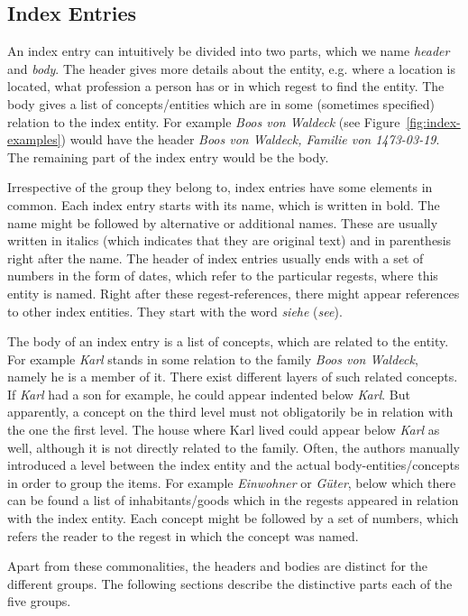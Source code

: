 \subsection{Index Entries}
An index entry can intuitively be divided into two parts, which we name \textit{header} and \textit{body}. The header gives more details about the entity, e.g. where a location is located, what profession a person has or in which regest to find the entity. The body gives a list of concepts/entities which are in some (sometimes specified) relation to the index entity. For example \textit{Boos von Waldeck} (see Figure~\ref{fig:index-examples}) would have the header \textit{Boos von Waldeck, Familie von 1473-03-19}. The remaining part of the index entry would be the body.

Irrespective of the group they belong to, index entries have some elements in common. Each index entry starts with its name, which is written in bold. The name might be followed by alternative or additional names. These are usually written in italics (which indicates that they are original text) and in parenthesis right after the name. The header of index entries usually ends with a set of numbers in the form of dates, which refer to the particular regests, where this entity is named. Right after these regest-references, there might appear references to other index entities. They start with the word \textit{siehe} (\textit{see}).

The body of an index entry is a list of concepts, which are related to the entity. For example \textit{Karl} stands in some relation to the family \textit{Boos von Waldeck}, namely he is a member of it. There exist different layers of such related concepts. If \textit{Karl} had a son for example, he could appear indented below \textit{Karl}. But apparently, a concept on the third level must not obligatorily be in relation with the one the first level. The house where Karl lived could appear below \textit{Karl} as well, although it is not directly related to the family. Often, the authors manually introduced a level between the index entity and the actual body-entities/concepts in order to group the items. For example \textit{Einwohner} or \textit{Güter}, below which there can be found a list of inhabitants/goods which in the regests appeared in relation with the index entity. Each concept might be followed by a set of numbers, which refers the reader to the regest in which the concept was named.

Apart from these commonalities, the headers and bodies are distinct for the different groups. The following sections describe the distinctive parts each of the five groups. 

